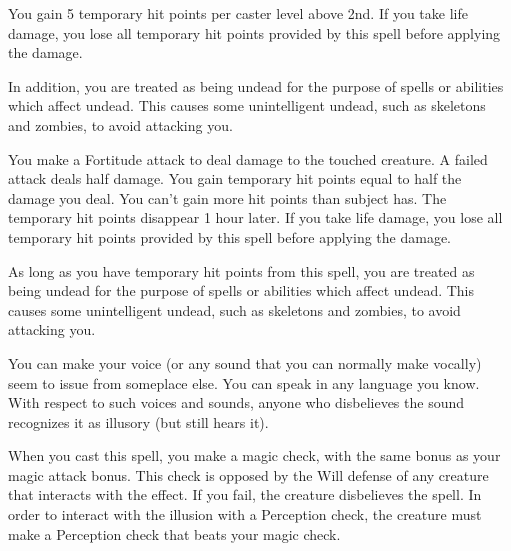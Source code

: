 \spelldur{\durlong}
\begin{spelleffect}
    You gain 5 temporary hit points  per caster level above 2nd. If you take life damage, you lose all temporary hit points provided by this spell before applying the damage.

    In addition, you are treated as being undead for the purpose of spells or abilities which affect undead. This causes some unintelligent undead, such as skeletons and zombies, to avoid attacking you.
\end{spelleffect}

\begin{spelleffect}
    You make a Fortitude attack to deal damage to the touched creature. A failed attack deals half damage. You gain temporary hit points equal to half the damage you deal. You can't gain more hit points than subject has. The temporary hit points disappear 1 hour later. If you take life damage, you lose all temporary hit points provided by this spell before applying the damage.

    As long as you have temporary hit points from this spell, you are treated as being undead for the purpose of spells or abilities which affect undead. This causes some unintelligent undead, such as skeletons and zombies, to avoid attacking you.
\end{spelleffect}

\spellrng{\rngclose}
\spelldur{\durshort \dismissable}
\begin{spelleffect}
    You can make your voice (or any sound that you can normally make vocally) seem to issue from someplace else. You can speak in any language you know. With respect to such voices and sounds, anyone who disbelieves the sound recognizes it as illusory (but still hears it).
\end{spelleffect}
\begin{spellnotes}
    When you cast this spell, you make a magic check, with the same bonus as your magic attack bonus. This check is opposed by the Will defense of any creature that interacts with the effect. If you fail, the creature disbelieves the spell. In order to interact with the illusion with a Perception check, the creature must make a Perception check that beats your magic check.
\end{spellnotes}

